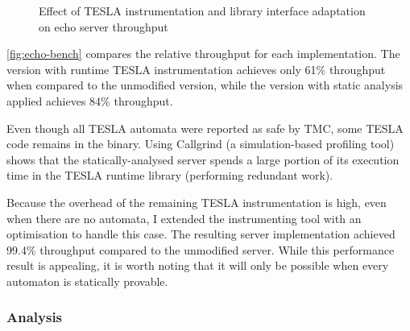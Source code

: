 \begin{figure}
  \centering
  \caption{Effect of TESLA instrumentation and library interface adaptation on
  echo server throughput}
  \label{fig:echo-bench}
\end{figure}

\autoref{fig:echo-bench} compares the relative throughput for each
implementation. The version with runtime TESLA instrumentation achieves only 61\%
throughput when compared to the unmodified version, while the version with
static analysis applied achieves 84\% throughput.

Even though all TESLA automata were reported as safe by TMC, some TESLA code
remains in the binary. Using Callgrind \cite{weidendorfer_tool_2004} (a
simulation-based profiling tool) shows that the statically-analysed server
spends a large portion of its execution time in the TESLA runtime library
(performing redundant work).

Because the overhead of the remaining TESLA instrumentation is high, even when
there are no automata, I extended the instrumenting tool with an optimisation to
handle this case. The resulting server implementation achieved 99.4\% throughput
compared to the unmodified server. While this performance result is appealing,
it is worth noting that it will only be possible when every automaton is
statically provable.

\subsubsection{Analysis} \label{sec:perf-analysis}

